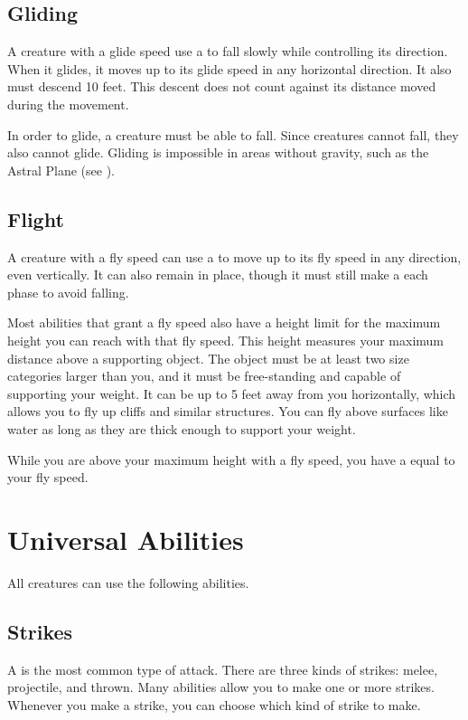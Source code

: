     \subsection{Gliding}\label{Gliding}
        A creature with a glide speed use a  to fall slowly while controlling its direction.
        When it glides, it moves up to its glide speed in any horizontal direction.
        It also must descend 10 feet.
        This descent does not count against its distance moved during the movement.

        In order to glide, a creature must be able to fall.
        Since  creatures cannot fall, they also cannot glide.
        Gliding is impossible in areas without gravity, such as the Astral Plane (see ).

    \subsection{Flight}\label{Flight}
        A creature with a fly speed can use a  to move up to its fly speed in any direction, even vertically.
        It can also remain in place, though it must still make a  each phase to avoid falling.

        \label{Height Limit} Most abilities that grant a fly speed also have a height limit for the maximum height you can reach with that fly speed.
        This height measures your maximum distance above a supporting object.
        The object must be at least two size categories larger than you, and it must be free-standing and capable of supporting your weight.
        It can be up to 5 feet away from you horizontally, which allows you to fly up cliffs and similar structures.
        You can fly above surfaces like water as long as they are thick enough to support your weight.

        While you are above your maximum height with a fly speed, you have a  equal to your fly speed.

\section{Universal Abilities}\label{Universal Abilities}
    All creatures can use the following abilities.

    \subsection{Strikes}\label{Strikes}
        A  is the most common type of attack.
        There are three kinds of strikes: melee, projectile, and thrown.
        Many abilities allow you to make one or more strikes.
        Whenever you make a strike, you can choose which kind of strike to make.

